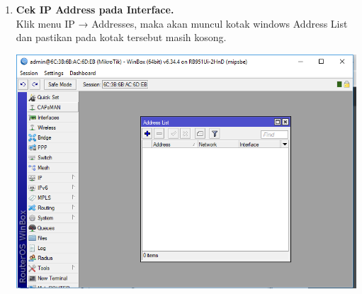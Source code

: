\documentclass[a4paper,12pt]{article}
\begin{document}
\begin{enumerate}
	\item \textbf{Cek IP Address pada Interface.\\}
	Klik menu IP → Addresses, maka akan muncul kotak windows Address List dan
	pastikan pada kotak tersebut masih kosong.
	\begin{center}
		\includegraphics[scale=.5]{Capture2}
	\end{center}
	
\end{enumerate}
\end{document}
